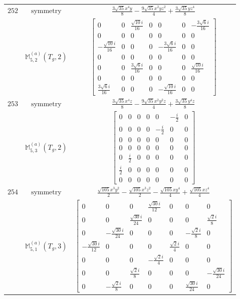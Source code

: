 \documentclass[fleqn,8pt,landscape]{jsarticle}
\begin{document}
\begin{longtable}{ccc}
$ 252 $ & $ \text{symmetry} $ & $ \frac{3 \sqrt{35} x^{4} y}{8} - \frac{9 \sqrt{35} x^{2} y z^{2}}{4} + \frac{3 \sqrt{35} y z^{4}}{8} $ \\
$  $ & $ \mathbb{M}_{5,2}^{(a)}(T_{g},2) $ & $ \begin{bmatrix} 0 & 0 & \frac{\sqrt{10} i}{16} & 0 & 0 & 0 & - \frac{3 \sqrt{6} i}{16} \\ 0 & 0 & 0 & 0 & 0 & 0 & 0 \\ - \frac{\sqrt{10} i}{16} & 0 & 0 & 0 & - \frac{3 \sqrt{6} i}{16} & 0 & 0 \\ 0 & 0 & 0 & 0 & 0 & 0 & 0 \\ 0 & 0 & \frac{3 \sqrt{6} i}{16} & 0 & 0 & 0 & \frac{\sqrt{10} i}{16} \\ 0 & 0 & 0 & 0 & 0 & 0 & 0 \\ \frac{3 \sqrt{6} i}{16} & 0 & 0 & 0 & - \frac{\sqrt{10} i}{16} & 0 & 0 \end{bmatrix} $ \\ \hline
$ 253 $ & $ \text{symmetry} $ & $ \frac{3 \sqrt{35} x^{4} z}{8} - \frac{9 \sqrt{35} x^{2} y^{2} z}{4} + \frac{3 \sqrt{35} y^{4} z}{8} $ \\
$  $ & $ \mathbb{M}_{5,3}^{(a)}(T_{g},2) $ & $ \begin{bmatrix} 0 & 0 & 0 & 0 & 0 & - \frac{i}{2} & 0 \\ 0 & 0 & 0 & 0 & - \frac{i}{2} & 0 & 0 \\ 0 & 0 & 0 & 0 & 0 & 0 & 0 \\ 0 & 0 & 0 & 0 & 0 & 0 & 0 \\ 0 & \frac{i}{2} & 0 & 0 & 0 & 0 & 0 \\ \frac{i}{2} & 0 & 0 & 0 & 0 & 0 & 0 \\ 0 & 0 & 0 & 0 & 0 & 0 & 0 \end{bmatrix} $ \\ \hline
$ 254 $ & $ \text{symmetry} $ & $ \frac{\sqrt{105} x^{3} y^{2}}{2} - \frac{\sqrt{105} x^{3} z^{2}}{2} - \frac{\sqrt{105} x y^{4}}{4} + \frac{\sqrt{105} x z^{4}}{4} $ \\
$  $ & $ \mathbb{M}_{5,1}^{(a)}(T_{g},3) $ & $ \begin{bmatrix} 0 & 0 & 0 & \frac{\sqrt{30} i}{12} & 0 & 0 & 0 \\ 0 & 0 & \frac{\sqrt{30} i}{24} & 0 & 0 & 0 & \frac{\sqrt{2} i}{8} \\ 0 & - \frac{\sqrt{30} i}{24} & 0 & 0 & 0 & - \frac{\sqrt{2} i}{8} & 0 \\ - \frac{\sqrt{30} i}{12} & 0 & 0 & 0 & \frac{\sqrt{2} i}{4} & 0 & 0 \\ 0 & 0 & 0 & - \frac{\sqrt{2} i}{4} & 0 & 0 & 0 \\ 0 & 0 & \frac{\sqrt{2} i}{8} & 0 & 0 & 0 & - \frac{\sqrt{30} i}{24} \\ 0 & - \frac{\sqrt{2} i}{8} & 0 & 0 & 0 & \frac{\sqrt{30} i}{24} & 0 \end{bmatrix} $ \\ \hline

\end{longtable}
\end{document}

